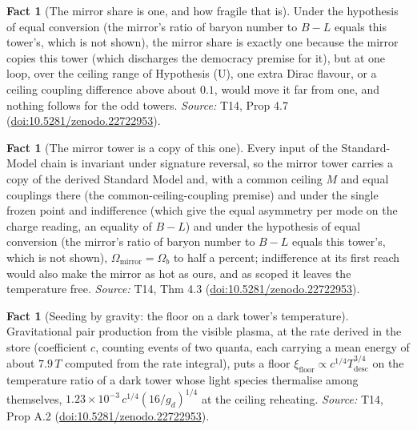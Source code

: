 \documentclass[11pt]{article}
\theoremstyle{definition}
\newtheorem{fact}[theorem]{Fact}
\theoremstyle{plain}
\begin{document}
\begin{fact}[The mirror share is one, and how fragile that is]\label{c:dark-matter.mirror-share-one-how-fragile}
Under the hypothesis of equal conversion (the mirror's ratio of baryon number to $B - L$ equals this tower's, which is not shown), the mirror share is exactly one because the mirror copies this tower (which discharges the democracy premise for it), but at one loop, over the ceiling range of Hypothesis (U), one extra Dirac flavour, or a ceiling coupling difference above about $0.1$, would move it far from one, and nothing follows for the odd towers.
\emph{Source:} T14, Prop 4.7 (\href{https://doi.org/10.5281/zenodo.22722953}{doi:10.5281/zenodo.22722953}).
\end{fact}

\begin{fact}[The mirror tower is a copy of this one]\label{c:dark-matter.mirror-tower-copy-one}
Every input of the Standard-Model chain is invariant under signature reversal, so the mirror tower carries a copy of the derived Standard Model and, with a common ceiling $M$ and equal couplings there (the common-ceiling-coupling premise) and under the single frozen point and indifference (which give the equal asymmetry per mode on the charge reading, an equality of $B - L$) and under the hypothesis of equal conversion (the mirror's ratio of baryon number to $B - L$ equals this tower's, which is not shown), $\Omega_{\mathrm{mirror}} = \Omega_{b}$ to half a percent; indifference at its first reach would also make the mirror as hot as ours, and as scoped it leaves the temperature free.
\emph{Source:} T14, Thm 4.3 (\href{https://doi.org/10.5281/zenodo.22722953}{doi:10.5281/zenodo.22722953}).
\end{fact}

\begin{fact}[Seeding by gravity: the floor on a dark tower's temperature]\label{c:dark-matter.seeding-gravity-floor-dark-towers-temperature}
Gravitational pair production from the visible plasma, at the rate derived in the store (coefficient $c$, counting events of two quanta, each carrying a mean energy of about $7.9\,T$ computed from the rate integral), puts a floor $\xi_{\mathrm{floor}} \propto c^{1/4}T_{\mathrm{desc}}^{3/4}$ on the temperature ratio of a dark tower whose light species thermalise among themselves, $1.23 \times 10^{-3}\,c^{1/4}(16/g_{d})^{1/4}$ at the ceiling reheating.
\emph{Source:} T14, Prop A.2 (\href{https://doi.org/10.5281/zenodo.22722953}{doi:10.5281/zenodo.22722953}).
\end{fact}
\end{document}
